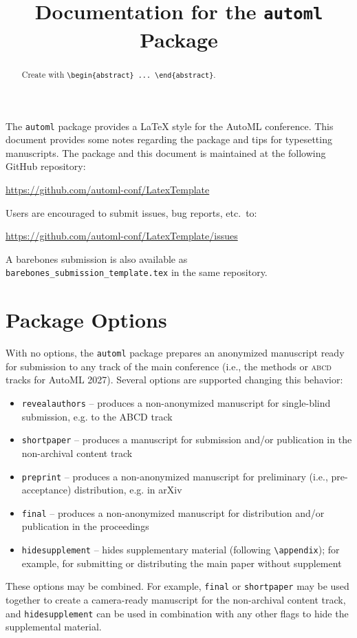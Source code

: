 \documentclass[11pt]{article}
\title{Documentation for the \texttt{automl} Package}
\author[1,$\ast$]{\nameemail{Author 1}{email1@example.com}}
\author[1,2,$\ast$]{\nameemail{Author 2}{email2@example.com}}
\author[2]{\nameemail{Author 3}{email3@example.com}}
\affil[$\ast$]{Equal contribution.}
\affil[1]{Institution 1}
\affil[2]{Institution 2}
\begin{document}
\maketitle

\begin{abstract}
  Create with \verb|\begin{abstract} ... \end{abstract}|.
\end{abstract}

The \texttt{automl} package provides a \LaTeX{} style for the AutoML conference.
This document provides some notes regarding the package and tips for typesetting
manuscripts. The package and this document is maintained at the following GitHub
repository:
\begin{center}
  \url{https://github.com/automl-conf/LatexTemplate}
\end{center}
Users are encouraged to submit issues, bug reports, etc.\ to:
\begin{center}
  \url{https://github.com/automl-conf/LatexTemplate/issues}
\end{center}

A barebones submission is also available as
\texttt{barebones\_submission\_template.tex} in the same repository.

\section{Package Options}

With no options, the \texttt{automl} package prepares an anonymized manuscript
ready for submission to any track of the main conference (i.e., the methods or
\textsc{abcd} tracks for AutoML 2027). Several options are supported changing
this behavior:
\begin{itemize}
\item \texttt{revealauthors} -- produces a non-anonymized manuscript for
  single-blind submission, e.g. to the ABCD track
\item \texttt{shortpaper} -- produces a manuscript for submission and/or
  publication in the non-archival content track
\item \texttt{preprint} -- produces a non-anonymized manuscript for
  preliminary (i.e., pre-acceptance) distribution, e.g. in arXiv
\item \texttt{final} -- produces a non-anonymized manuscript for distribution
  and/or publication in the proceedings
\item \texttt{hidesupplement} -- hides supplementary material (following
  \verb|\appendix|); for example, for submitting or distributing the main paper
  without supplement
\end{itemize}
These options may be combined. For example, \texttt{final} or \texttt{shortpaper}
may be used together to create a camera-ready manuscript for the non-archival content track,
and \texttt{hidesupplement} can be used in combination with any other flags to
hide the supplemental material.
\end{document}
